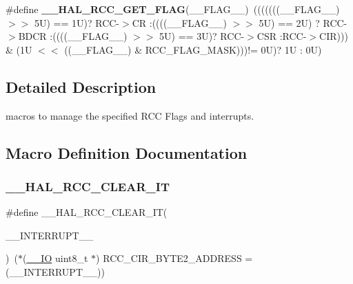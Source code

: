 \begin{DoxyCompactItemize}
\#define {\bfseries \+\_\+\+\_\+\+H\+A\+L\+\_\+\+R\+C\+C\+\_\+\+G\+E\+T\+\_\+\+F\+L\+AG}(\+\_\+\+\_\+\+F\+L\+A\+G\+\_\+\+\_\+)~(((((((\+\_\+\+\_\+\+F\+L\+A\+G\+\_\+\+\_\+) $>$$>$ 5\+U) == 1\+U)? R\+C\+C-\/$>$\+C\+R \+:((((\+\_\+\+\_\+\+F\+L\+A\+G\+\_\+\+\_\+) $>$$>$ 5\+U) == 2\+U) ? R\+C\+C-\/$>$\+B\+D\+C\+R \+:((((\+\_\+\+\_\+\+F\+L\+A\+G\+\_\+\+\_\+) $>$$>$ 5\+U) == 3\+U)? R\+C\+C-\/$>$\+C\+S\+R \+:\+R\+C\+C-\/$>$\+C\+I\+R))) \& (1\+U $<$$<$ ((\+\_\+\+\_\+\+F\+L\+A\+G\+\_\+\+\_\+) \& R\+C\+C\+\_\+\+F\+L\+A\+G\+\_\+\+M\+A\+S\+K)))!= 0\+U)? 1\+U \+: 0\+U)
\end{DoxyCompactItemize}


\subsection{Detailed Description}
macros to manage the specified R\+CC Flags and interrupts. 



\subsection{Macro Definition Documentation}
\mbox{\label{group___r_c_c___flags___interrupts___management_ga9d8ab157f58045b8daf8136bee54f139}} 
\subsubsection{\texorpdfstring{\+\_\+\+\_\+\+H\+A\+L\+\_\+\+R\+C\+C\+\_\+\+C\+L\+E\+A\+R\+\_\+\+IT}{\_\_HAL\_RCC\_CLEAR\_IT}}
{\footnotesize\ttfamily \#define \+\_\+\+\_\+\+H\+A\+L\+\_\+\+R\+C\+C\+\_\+\+C\+L\+E\+A\+R\+\_\+\+IT(\begin{DoxyParamCaption}\item[{}]{\+\_\+\+\_\+\+I\+N\+T\+E\+R\+R\+U\+P\+T\+\_\+\+\_\+ }\end{DoxyParamCaption})~($\ast$(\hyperlink{core__sc300_8h_aec43007d9998a0a0e01faede4133d6be}{\+\_\+\+\_\+\+IO} uint8\+\_\+t $\ast$) R\+C\+C\+\_\+\+C\+I\+R\+\_\+\+B\+Y\+T\+E2\+\_\+\+A\+D\+D\+R\+E\+SS = (\+\_\+\+\_\+\+I\+N\+T\+E\+R\+R\+U\+P\+T\+\_\+\+\_\+))}



